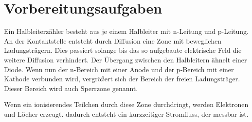 \section{Vorbereitungsaufgaben}
\label{sec:vorbereitung}

Ein Halbleiterzähler besteht aus je einem Halbleiter mit n-Leitung und p-Leitung. An der Kontaktstelle entsteht durch Diffusion eine Zone mit
beweglichen Ladungsträgern. Dies passiert solange bis das so aufgebaute elektrische Feld die weitere Diffusion verhindert. Der Übergang zwischen 
den Halbleitern ähnelt einer Diode. Wenn nun der n-Bereich mit einer Anode und der p-Bereich mit einer Kathode verbunden wird, vergrößert sich
der Bereich der freien Ladungsträger. Dieser Bereich wird auch Sperrzone genannt.

Wenn ein ionisierendes Teilchen durch diese Zone durchdringt, werden Elektronen und Löcher erzeugt. dadurch entsteht ein kurzzeitiger Stromfluss,
der messbar ist.
